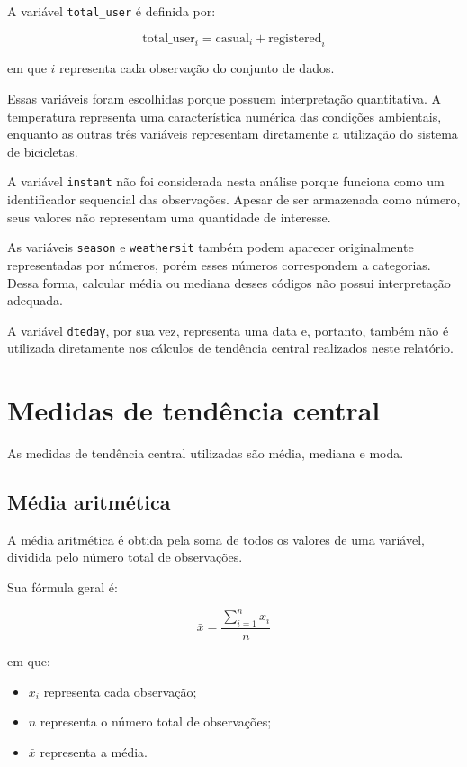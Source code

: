 \documentclass[12pt,a4paper]{article}
\begin{document}
A variável \texttt{total\_user} é definida por:

\begin{equation}
\text{total\_user}_i =
\text{casual}_i + \text{registered}_i
\end{equation}

em que $i$ representa cada observação do conjunto de dados.

Essas variáveis foram escolhidas porque possuem interpretação quantitativa.
A temperatura representa uma característica numérica das condições
ambientais, enquanto as outras três variáveis representam diretamente a
utilização do sistema de bicicletas.

A variável \texttt{instant} não foi considerada nesta análise porque funciona
como um identificador sequencial das observações. Apesar de ser armazenada
como número, seus valores não representam uma quantidade de interesse.

As variáveis \texttt{season} e \texttt{weathersit} também podem aparecer
originalmente representadas por números, porém esses números correspondem a
categorias. Dessa forma, calcular média ou mediana desses códigos não possui
interpretação adequada.

A variável \texttt{dteday}, por sua vez, representa uma data e, portanto,
também não é utilizada diretamente nos cálculos de tendência central
realizados neste relatório.

\section{Medidas de tendência central}

As medidas de tendência central utilizadas são média, mediana e moda.

\subsection{Média aritmética}

A média aritmética é obtida pela soma de todos os valores de uma variável,
dividida pelo número total de observações.

Sua fórmula geral é:

\begin{equation}
\bar{x} =
\frac{\sum_{i=1}^{n} x_i}{n}
\end{equation}

em que:

\begin{itemize}
    \item $x_i$ representa cada observação;
    \item $n$ representa o número total de observações;
    \item $\bar{x}$ representa a média.
\end{itemize}
\end{document}
